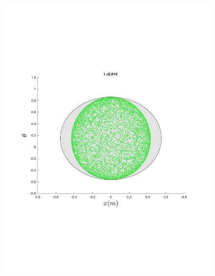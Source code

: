 \begin{figure}
{\begin{minipage}{0.5\textwidth}
\begin{minipage}[b]{0.5\textwidth}
        \includegraphics[width=\textwidth]{figures/method/FunnelSimOverlaid3funnel-1y-theta}
      \end{minipage}%
      \\
      \begin{minipage}[b]{0.5\textwidth}

\end{minipage}
\end{minipage}}
\end{figure}
